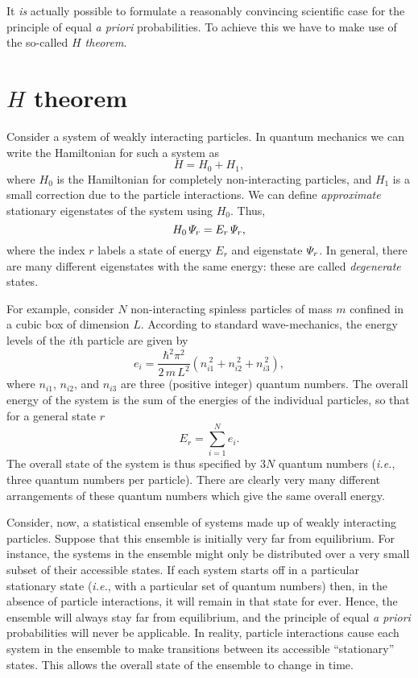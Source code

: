 It {\em is}\/ actually 
  possible to formulate a reasonably  convincing scientific case for
the principle of equal {\em a priori}\/ probabilities. To achieve
this we  have to make use of the 
so-called   {\em $H$ theorem}.

\section{$H$ theorem}\label{s3.9}
Consider a system of weakly interacting particles. In quantum
mechanics we can write the Hamiltonian for such a system as
\begin{equation}
H = H_0 + H_1,
\end{equation}
where $H_0$ is the Hamiltonian for completely non-interacting particles, and
$H_1$ is a small correction due to the particle interactions. We can define
{\em approximate}\/ stationary eigenstates of the system using $H_0$. Thus,
\begin{equation}
H_0 \,{\mit\Psi}_r = E_r \,{\mit\Psi}_r,
\end{equation}
where the index $r$ labels a state of energy $E_r$ and eigenstate
${\mit\Psi}_r$. In general, there are many
different eigenstates with the same energy: these are called {\em degenerate}
states. 

For example, consider $N$ non-interacting spinless particles
of mass $m$
confined in a cubic box of dimension $L$. According to standard
wave-mechanics, the
energy levels of the $i$th particle are given by
\begin{equation}
e_i = \frac{\hbar^2 \pi^2}{2\,m \,L^2}\left( n_{i1}^{~2}+n_{i2}^{~2}
+n_{i3}^{~2}\right),
\end{equation}
where $n_{i1}$, $n_{i2}$, and $n_{i3}$ are three (positive integer) quantum numbers.
The overall energy of the system is the sum of the energies of the
individual particles, so that for a general state $r$
\begin{equation}
E_r = \sum_{i=1}^N e_i.
\end{equation}
The  overall state of the system is thus specified by $3N$ quantum numbers 
({\em i.e.},
three quantum numbers per particle). 
There are clearly very many different arrangements of these quantum numbers which
give the same overall energy.

Consider, now, a statistical ensemble of systems made up
of weakly interacting particles. Suppose that this ensemble
is initially very far from equilibrium. For instance,
the systems in the ensemble might only be  distributed
over a very small subset of their accessible states.
If each system starts off in a 
particular stationary state ({\em i.e.}, with a particular set of quantum
numbers) then, in the absence of particle interactions, it will remain 
in that state for ever. Hence, the
ensemble will always stay far from equilibrium, and the principle of
equal {\em a priori}\/ probabilities will never be applicable. In reality,
particle interactions  cause each system in the ensemble to make
transitions between its accessible  ``stationary'' states. This allows the
overall state of the ensemble to change in time.

